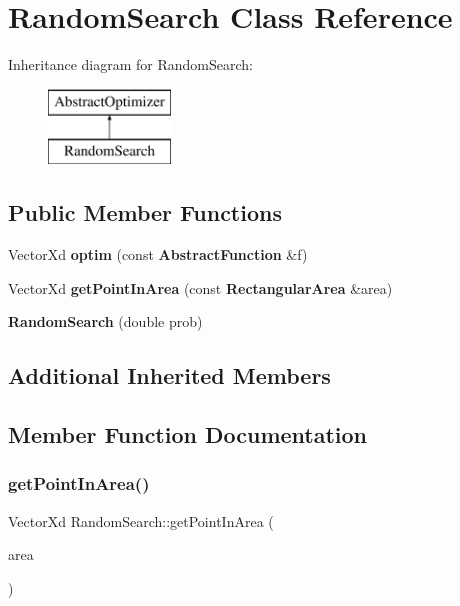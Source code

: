 \section{Random\+Search Class Reference}
\label{class_random_search}
Inheritance diagram for Random\+Search\+:\begin{figure}[H]
\begin{center}
\leavevmode
\includegraphics[height=2.000000cm]{class_random_search}
\end{center}
\end{figure}
\subsection*{Public Member Functions}
\begin{DoxyCompactItemize}
\item 
Vector\+Xd \textbf{ optim} (const \textbf{ Abstract\+Function} \&f)
\item 
Vector\+Xd \textbf{ get\+Point\+In\+Area} (const \textbf{ Rectangular\+Area} \&area)
\item 
\mbox{\label{class_random_search_a3158fb489b681187d450c5297b90ce84}} 
{\bfseries Random\+Search} (double prob)
\end{DoxyCompactItemize}
\subsection*{Additional Inherited Members}


\subsection{Member Function Documentation}
\mbox{\label{class_random_search_a5f7910c44bb6a57851a01fb0a868ba8c}} 
\subsubsection{get\+Point\+In\+Area()}
{\footnotesize\ttfamily Vector\+Xd Random\+Search\+::get\+Point\+In\+Area (\begin{DoxyParamCaption}\item[{const \textbf{ Rectangular\+Area} \&}]{area }\end{DoxyParamCaption})}

